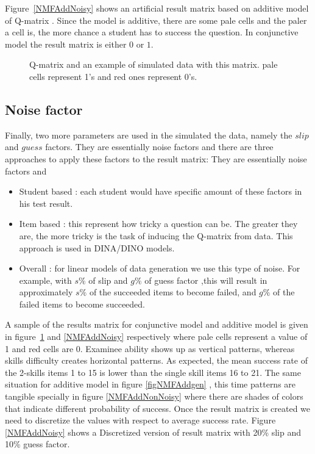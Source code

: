 Figure~\ref{NMFAddNoisy} shows an artificial result matrix based on additive model of Q-matrix . Since the model is additive, there are some pale cells and the paler a cell is, the more chance a student has to success the question. In conjunctive model the result matrix is either $0$ or $1$. 


\begin{figure}[ht]
\centering

\quad
\caption{Q-matrix and an example of simulated data with this matrix.  pale cells represent 1's and red ones represent 0's.}
\label{figqmatrixandResutM}
\end{figure}



\subsection{Noise factor}

Finally, two more parameters are used in the simulated the data, namely the $\mathit{slip}$ and $\mathit{guess}$ factors. They are essentially noise factors and there are three approaches to apply these factors to the result matrix:
They are essentially noise factors and 
\begin{itemize}
\item Student based : each student would have specific amount of these factors in his test result.
\item Item based : this represent how tricky a question can be. The greater they are, the more tricky is the task of inducing the Q-matrix from data. This approach is used in DINA/DINO models.
\item Overall : for linear models of data generation we use this type of noise. For example, with $s\%$ of slip and $g\%$ of guess factor ,this will result in approximately $s\%$ of the succeeded items to become failed, and $g\%$ of the failed items to become succeeded.

\end{itemize}

A sample of the results matrix for conjunctive model and additive model is given in figure~\ref{figqmatrixandResutM} and  \ref{NMFAddNoisy} respectively where pale cells represent a value of 1 and red cells are 0. Examinee ability shows up as vertical patterns, whereas skills difficulty creates horizontal patterns. As expected, the mean success rate of the 2-skills items 1 to 15 is lower than the single skill items 16 to 21. The same situation for additive model in figure \ref{figNMFAddgen} , this time patterns are tangible specially in figure \ref{NMFAddNonNoisy} where there are shades of colors that indicate different probability of success. Once the result matrix is created we need to discretize the values with respect to average success rate. Figure \ref{NMFAddNoisy} shows a Discretized version of result matrix with 20\% slip and 10\% guess factor.




